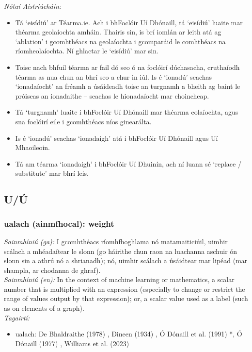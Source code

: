 \documentclass{article}
\begin{document}
 \noindent \textit{Nótaí Aistriúcháin:}
\begin{itemize}
	\item Tá `eisídiú' ar Téarma.ie. Ach i bhFoclóir Uí Dhónaill, tá `eisídiú' luaite mar théarma geolaíochta amháin. Thairis sin, is brí iomlán ar leith atá ag `ablation' i gcomhthéacs na geolaíochta i gcomparáid le comhthéacs na ríomheolaíochta. Ní ghlactar le `eisídiú' mar sin.
	\item Toisc nach bhfuil téarma ar fail dó seo ó na foclóirí dúchasacha, cruthaíodh téarma as nua chun an bhrí seo a chur in iúl. Is é `ionadú' seachas `ionadaíocht' an fréamh a úsáideadh toisc an turgnamh a bheith ag baint le próiseas an ionadaithe -- seachas le hionadaíocht mar choincheap.
	\item Tá `turgnamh' luaite i bhFoclóir Uí Dhónaill mar théarma eolaíochta, agus sna foclóirí eile i gcomhthéacs níos ginearálta.
	\item Is é `ionadú' seachas `ionadaigh' atá i bhFoclóir Uí Dhónaill agus Uí Mhaoileoin.
	\item Tá am téarma `ionadaigh' i bhFoclóir Uí Dhuinín, ach ní luann sé `replace / substitute' mar bhrí leis.
\end{itemize}


\subsection*{U/Ú}

\subsubsection*{ualach (ainmfhocal): weight}
 \noindent \textit{Sainmhíniú (ga):} I gcomhthéacs ríomhfhoghlama nó matamaiticiúil, uimhir scálach a mhéadaítear le slonn (go háirithe chun raon na luachanna aschuir ón slonn sin a athrú nó a shrianadh); nó, uimhir scálach a úsáidtear mar lipéad (mar shampla, ar chodanna de ghraf).
\\
 \noindent \textit{Sainmhíniú (en):} In the context of machine learning or mathematics, a scalar number that is multiplied with an expression (especially to change or restrict the range of values output by that expression); or, a scalar value used as a label (such as on elements of a graph).
\\
 \noindent \textit{Tagairtí:}
\begin{itemize}
	\item ualach: De Bhaldraithe (1978) \cite{de-bhaldraithe}, Dineen (1934) \cite{dineen}, Ó Dónaill et al. (1991) \cite{focloir-beag}*, Ó Dónaill (1977) \cite{odonaill}, Williams et al. (2023) \cite{storchiste}
\end{itemize}
\end{document}
